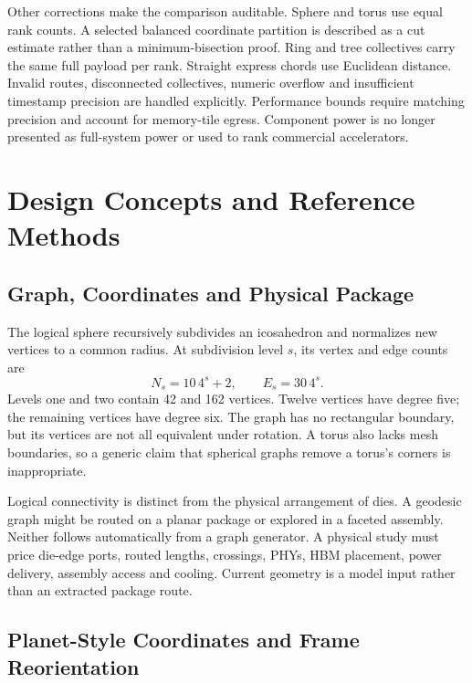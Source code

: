 \documentclass[11pt,a4paper]{article}
\begin{document}
Other corrections make the comparison auditable. Sphere and torus use equal
rank counts. A selected balanced coordinate partition is described as a cut
estimate rather than a minimum-bisection proof. Ring and tree collectives
carry the same full payload per rank. Straight express chords use Euclidean
distance. Invalid routes, disconnected collectives, numeric overflow and
insufficient timestamp precision are handled explicitly. Performance bounds
require matching precision and account for memory-tile egress. Component
power is no longer presented as full-system power or used to rank commercial
accelerators.

\section{Design Concepts and Reference Methods}\label{sec:concepts}

\subsection{Graph, Coordinates and Physical Package}

The logical sphere recursively subdivides an icosahedron and normalizes new
vertices to a common radius. At subdivision level $s$, its vertex and edge
counts are
\begin{equation}
N_s=10\,4^s+2,\qquad E_s=30\,4^s.
\end{equation}
Levels one and two contain 42 and 162 vertices. Twelve vertices have degree
five; the remaining vertices have degree six. The graph has no rectangular
boundary, but its vertices are not all equivalent under rotation. A torus
also lacks mesh boundaries, so a generic claim that spherical graphs remove
a torus's corners is inappropriate.

Logical connectivity is distinct from the physical arrangement of dies. A
geodesic graph might be routed on a planar package or explored in a faceted
assembly. Neither follows automatically from a graph generator. A physical
study must price die-edge ports, routed lengths, crossings, PHYs, HBM
placement, power delivery, assembly access and cooling. Current geometry is
a model input rather than an extracted package route.

\subsection{Planet-Style Coordinates and Frame Reorientation}
\end{document}
